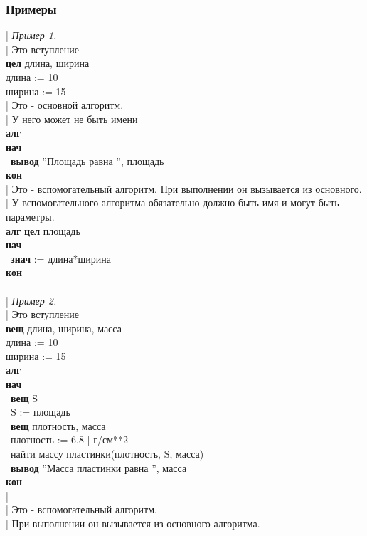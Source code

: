 \documentclass[12pt,a4paper]{article}
\newcommand{\otstup}{\textperiodcentered\ }
\begin{document}
\subsubsection{Примеры}
\small
{\sffamily
| \textit{Пример 1.}\\
|  Это вступление\\
\textbf{цел} длина, ширина\\
длина := 10\\
ширина := 15\\
|    Это - основной алгоритм.\\
| У него может не быть имени\\
\textbf{алг}\\
\textbf{нач}\\
\otstup \textbf{вывод} ''Площадь равна '', площадь\\
\textbf{кон}\\
| Это - вспомогательный алгоритм. При выполнении он вызывается из основного.\\
| У вспомогательного алгоритма обязательно должно быть имя и могут быть параметры.\\
\textbf{алг} \textbf{цел} площадь\\
\textbf{нач}\\
\otstup \textbf{знач} := длина*ширина\\
\textbf{кон}\\
~\\
| \textit{Пример 2.}\\
| Это вступление\\
\textbf{вещ} длина, ширина, масса\\
длина := 10\\
ширина := 15\\
\textbf{алг}\\
\textbf{нач}\\
\otstup \textbf{вещ} S\\
\otstup S := площадь\\
\otstup \textbf{вещ} плотность, масса\\
\otstup плотность := 6.8 | г/см**2\\
\otstup найти массу пластинки(плотность, S, масса)\\
\otstup \textbf{вывод} ''Масса пластинки равна '', масса\\
\textbf{кон}\\
|\\
| Это - вспомогательный алгоритм.\\
| При выполнении он вызывается из основного алгоритма.\\
}
\end{document}
